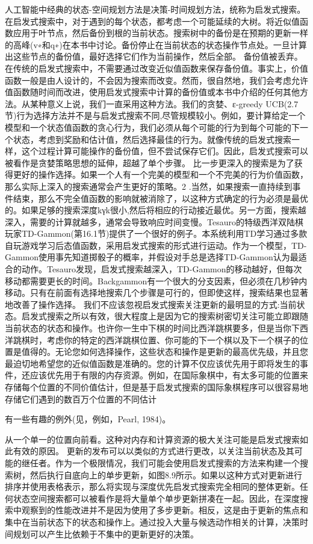 人工智能中经典的状态-空间规划方法是决策-时间规划方法，统称为启发式搜索。在启发式搜索中，对于遇到的每个状态，都考虑一个可能延续的大树。将近似值函数应用于叶节点，然后备份到根的当前状态。搜索树中的备份是在预期的更新一样的高峰(v∗和q∗)在本书中讨论。备份停止在当前状态的状态操作节点处。一旦计算出这些节点的备份值，最好选择它们作为当前操作，然后全部。
备份值被丢弃。
在传统的启发式搜索中，不需要通过改变近似值函数来保存备份值。事实上，价值函数一般是由人设计的，不会因为搜索而改变。然而，很自然地，我们会考虑允许值函数随时间而改进，使用启发式搜索中计算的备份值或本书中介绍的任何其他方法。从某种意义上说，我们一直采用这种方法。我们的贪婪、ε-greedy UCB(2.7节)行为选择方法并不是与启发式搜索不同,尽管规模较小。例如，要计算给定一个模型和一个状态值函数的贪心行为，我们必须从每个可能的行为到每个可能的下一个状态，考虑到奖励和估计值，然后选择最佳的行为。就像传统的启发式搜索一样，这个过程计算可能操作的备份值，但不尝试保存它们。因此，启发式搜索可以被看作是贪婪策略思想的延伸，超越了单个步骤。
比一步更深入的搜索是为了获得更好的操作选择。如果一个人有一个完美的模型和一个不完美的行为价值函数，那么实际上深入的搜索通常会产生更好的策略。2 .当然，如果搜索一直持续到事件结束，那么不完全值函数的影响就被消除了，以这种方式确定的行为必须是最优的。如果足够的搜索深度kγk很小,然后将相应的行动接近最优。另一方面，搜索越深入，需要的计算就越多，通常会导致响应时间变慢。Tesauro的特级西洋双陆棋玩家TD-Gammon(第16.1节)提供了一个很好的例子。本系统利用TD学习通过多款自玩游戏学习后态值函数，采用启发式搜索的形式进行运动。作为一个模型，TD-Gammon使用事先知道掷骰子的概率，并假设对手总是选择TD-Gammon认为最适合的动作。Tesauro发现，启发式搜索越深入，TD-Gammon的移动越好，但每次移动都需要更长的时间。Backgammon有一个很大的分支因素，但必须在几秒钟内移动。只有在前面有选择地搜索几个步骤是可行的，但即使这样，搜索结果也显著地改善了操作选择。
我们不应该忽视启发式搜索关注更新的最明显的方式:当前状态。启发式搜索之所以有效，很大程度上是因为它的搜索树密切关注可能立即跟随当前状态的状态和操作。也许你一生中下棋的时间比西洋跳棋要多，但是当你下西洋跳棋时，考虑你的特定的西洋跳棋位置、你可能的下一个棋以及下一个棋子的位置是值得的。无论您如何选择操作，这些状态和操作是更新的最高优先级，并且您最迫切地希望您的近似值函数是准确的。您的计算不仅应该优先用于即将发生的事件，还应该优先用于有限的内存资源。例如，在国际象棋中，有太多可能的位置来存储每个位置的不同价值估计，但是基于启发式搜索的国际象棋程序可以很容易地存储它们遇到的数百万个位置的不同估计

有一些有趣的例外(见，例如，Pearl, 1984)。

从一个单一的位置向前看。这种对内存和计算资源的极大关注可能是启发式搜索如此有效的原因。
更新的发布可以以类似的方式进行更改，以关注当前状态及其可能的继任者。作为一个极限情况，我们可能会使用启发式搜索的方法来构建一个搜索树，然后执行自底向上的单步更新，如图8.9所示。如果以这种方式对更新进行排序并使用表格表示，那么将实现与深度优先启发式搜索完全相同的整体更新。任何状态空间搜索都可以被看作是将大量单个单步更新拼凑在一起。因此，在深度搜索中观察到的性能改进并不是因为使用了多步更新。相反，这是由于更新的焦点和集中在当前状态下的状态和操作上。通过投入大量与候选动作相关的计算，决策时间规划可以产生比依赖于不集中的更新更好的决策。
 

